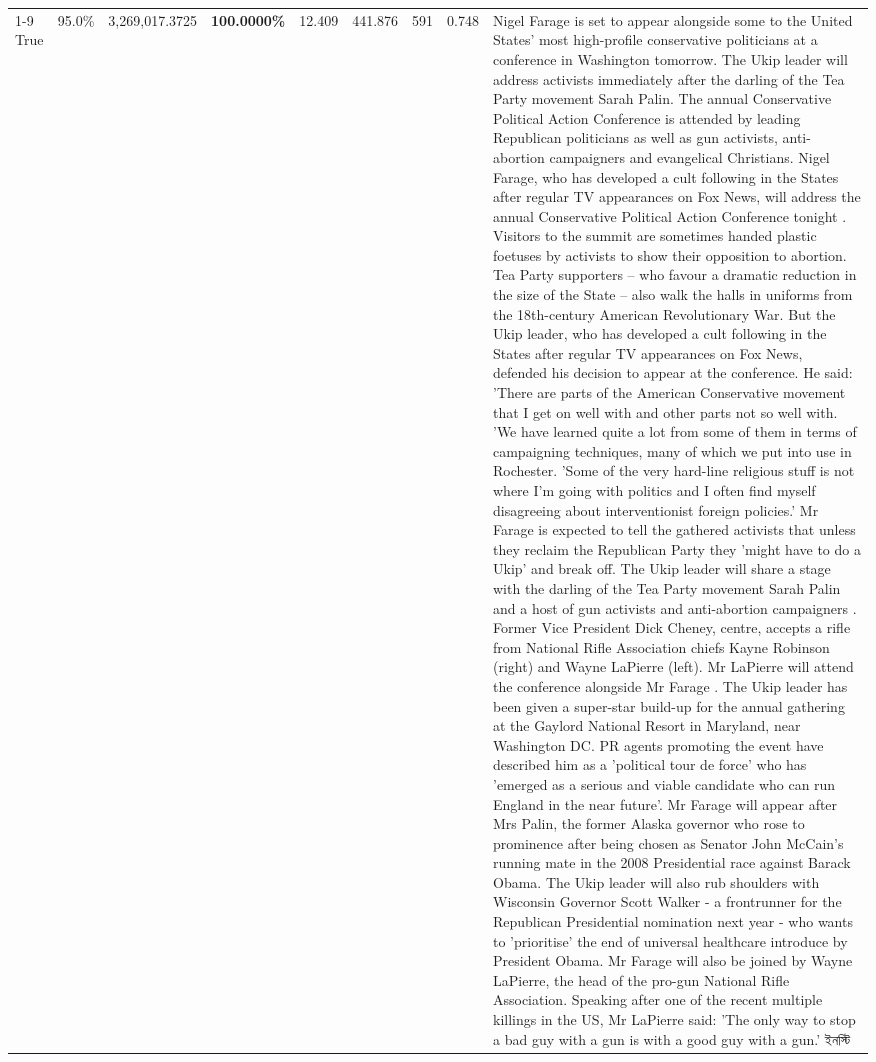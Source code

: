 \begin{table}[H]
\begin{tabular}{lllrlllll}
\cline{1-9}
True & 95.0\% & 3,269,017.3725 & \bfseries \color{red} 100.0000\% & 12.409 & 441.876 & 591 & 0.748 & Nigel Farage is set to appear alongside some to the United States' most high-profile conservative politicians at a conference in Washington tomorrow. The Ukip leader will address activists immediately after the darling of the Tea Party movement Sarah Palin. The annual Conservative Political Action Conference is attended by leading Republican politicians as well as gun activists, anti-abortion campaigners and evangelical Christians. Nigel Farage, who has developed a cult following in the States after regular TV appearances on Fox News, will address the annual Conservative Political Action Conference tonight . Visitors to the summit are sometimes handed plastic foetuses by activists to show their opposition to abortion. Tea Party supporters – who favour a dramatic reduction in the size of the State – also walk the halls in uniforms from the 18th-century American Revolutionary War. But the Ukip leader, who has developed a cult following in the States after regular TV appearances on Fox News, defended his decision to appear at the conference. He said: 'There are parts of the American Conservative movement that I get on well with and other parts not so well with. 'We have learned quite a lot from some of them in terms of campaigning techniques, many of which we put into use in Rochester. 'Some of the very hard-line religious stuff is not where I'm going with politics and I often find myself disagreeing about interventionist foreign policies.' Mr Farage is expected to tell the gathered activists that unless they reclaim the Republican Party they 'might have to do a Ukip' and break off. The Ukip leader will share a stage with the darling of the Tea Party movement Sarah Palin and a host of gun activists and anti-abortion campaigners . Former Vice President Dick Cheney, centre, accepts a rifle from National Rifle Association chiefs Kayne Robinson (right) and Wayne LaPierre (left). Mr LaPierre will attend the conference alongside Mr Farage . The Ukip leader has been given a super-star build-up for the annual gathering at the Gaylord National Resort in Maryland, near Washington DC. PR agents promoting the event have described him as a 'political tour de force' who has 'emerged as a serious and viable candidate who can run England in the near future'. Mr Farage will appear after Mrs Palin, the former Alaska governor who rose to prominence after being chosen as Senator John McCain's running mate in the 2008 Presidential race against Barack Obama. The Ukip leader will also rub shoulders with Wisconsin Governor Scott Walker - a frontrunner for the Republican Presidential nomination next year - who wants to 'prioritise' the end of universal healthcare introduce by President Obama. Mr Farage will also be joined by Wayne LaPierre, the head of the pro-gun National Rifle Association. Speaking after one of the recent multiple killings in the US, Mr LaPierre said: 'The only way to stop a bad guy with a gun is with a good guy with a gun.' ইনস্টি \\

\end{tabular}
\end{table}
